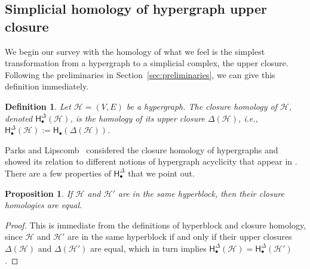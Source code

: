 \documentclass{amsart}
\newtheorem{definition}[theorem]{Definition}
\newtheorem{proposition}[theorem]{Proposition}
\newcommand{\Hgroup}	     {\mathsf{H}}
\renewcommand{\hom}[2]{\Hgroup_{#2}^{#1}}
\renewcommand{\H}{\mathcal{H}}
\begin{document}
\subsection{Simplicial homology of hypergraph upper closure}
\label{sec:closure-homology}

We begin our survey with the homology of what we feel is the simplest transformation from a hypergraph to a simplicial complex, the upper closure.
Following the preliminaries in Section~\ref{sec:preliminaries}, we can give this definition immediately.
\begin{definition}
Let $\H=(V, E)$ be a hypergraph. 
The \emph{closure homology} of $\H$, denoted $\hom{\Delta}{\bullet}(\H)$, is the homology of its upper closure $\Delta(\H)$, i.e.,  $\hom{\Delta}{\bullet}(\H) := \hom{}{\bullet}(\Delta(\H))$.
\end{definition}
Parks and Lipscomb~\cite{upscomb1991homology} considered the closure homology of hypergraphs and showed its relation to different notions of hypergraph acyclicity that appear in \cite{fagin1983degrees}. 
There are a few properties of $\hom{\Delta}{\bullet}$ that we point out.

\begin{proposition}
If $\H$ and $\H'$ are in the same hyperblock, then their closure homologies are equal. 
\end{proposition}
\begin{proof}
This is immediate from the definitions of hyperblock and closure homology, since $\H$ and $\H'$ are in the same hyperblock if and only if their upper closures $\Delta(\H)$ and $\Delta(\H')$ are equal, which in turn implies $\hom{\Delta}{\bullet}(\H) = \hom{\Delta}{\bullet}(\H')$.
\end{proof}
\end{document}
